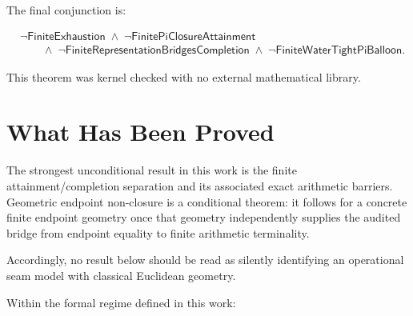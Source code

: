 \documentclass[11pt,a4paper]{article}
\newcommand{\FiniteExhaustion}{\mathsf{FiniteExhaustion}}
\newcommand{\FinitePiClosureAttainment}{\mathsf{FinitePiClosureAttainment}}
\newcommand{\FiniteWaterTightPiBalloon}{\mathsf{FiniteWaterTightPiBalloon}}
\newcommand{\FiniteRepresentationBridgesCompletion}{\mathsf{FiniteRepresentationBridgesCompletion}}
\begin{document}
The final conjunction is:

\[
\boxed{
\begin{aligned}
&\neg\FiniteExhaustion
\;\land\;
\neg\FinitePiClosureAttainment
\\[2pt]
&\qquad\land\;
\neg\FiniteRepresentationBridgesCompletion
\;\land\;
\neg\FiniteWaterTightPiBalloon.
\end{aligned}
}
\]

This theorem was kernel checked with no external mathematical library.


\section{What Has Been Proved}

The strongest unconditional result in this work is the finite
attainment/completion separation and its associated exact arithmetic
barriers. Geometric endpoint non-closure is a conditional theorem:
it follows for a concrete finite endpoint geometry once that geometry
independently supplies the audited bridge from endpoint equality to
finite arithmetic terminality.

Accordingly, no result below should be read as silently identifying an
operational seam model with classical Euclidean geometry.



Within the formal regime defined in this work:
\end{document}
